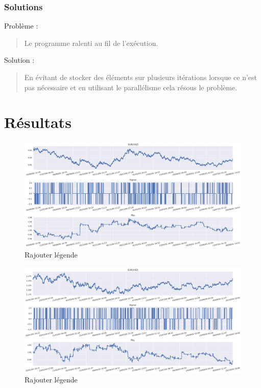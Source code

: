 \documentclass{beamer}
\begin{document}
	\begin{frame}
		\frametitle{Solutions}
		Problème :
		\begin{quote}
			Le programme ralenti au fil de l'exécution.
		\end{quote}
		
		Solution :
		\begin{quote}
			En évitant de stocker des éléments sur plusieurs itérations lorsque ce n'est pas nécessaire et en utilisant le parallélisme cela résous le problème.
		\end{quote}
	\end{frame}
	
	\section{Résultats}

	\begin{frame}
		\begin{figure}
			\includegraphics[scale=0.275]{res/eursud_2000-2001}
			\caption{Rajouter légende}
		\end{figure}
	\end{frame}

	\begin{frame}
		\begin{figure}
			\includegraphics[scale=0.275]{res/eurusd_2004-2005}				\caption{Rajouter légende}
		\end{figure}
	\end{frame}
\end{document}
